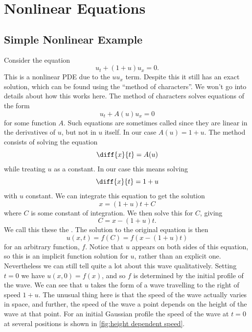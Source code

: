 \documentclass[fleqn]{NotesClass}
\begin{document}
    \chapter{Nonlinear Equations}
    \section{Simple Nonlinear Example}
    \label{sec:simple nonlinear example}
    Consider the equation
    \begin{equation}
        u_t + (1 + u)u_x = 0.
    \end{equation}
    This is a nonlinear PDE due to the \(uu_x\) term.
    Despite this it still has an exact solution, which can be found using the \enquote{method of characters}.
    We won't go into details about how this works here.
    The method of characters solves equations of the form
    \begin{equation}
        u_t + A(u) u_x = 0
    \end{equation}
    for some function \(A\).
    Such equations are sometimes called  since they are linear in the derivatives of \(u\), but not in \(u\) itself.
    In our case \(A(u) = 1 + u\).
    The method consists of solving the equation
    \begin{equation}
        \diff{x}{t} = A(u)
    \end{equation}
    while treating \(u\) as a constant.
    In our case this means solving
    \begin{equation}
        \diff{x}{t} = 1 + u
    \end{equation}
    with \(u\) constant.
    We can integrate this equation to get the solution
    \begin{equation}
        x = (1 + u)t + C
    \end{equation}
    where \(C\) is some constant of integration.
    We then solve this for \(C\), giving
    \begin{equation}
        C = x - (1 + u)t.
    \end{equation}
    We call this these the .
    The solution to the original equation is then
    \begin{equation}
        u(x, t) = f(C) = f(x - (1 + u)t)
    \end{equation}
    for an arbitrary function, \(f\).
    Notice that \(u\) appears on both sides of this equation, so this is an implicit function solution for \(u\), rather than an explicit one.
    Nevertheless we can still tell quite a lot about this wave qualitatively.
    Setting \(t = 0\) we have \(u(x, 0) = f(x)\), and so \(f\) is determined by the initial profile of the wave.
    We can see that \(u\) takes the form of a wave travelling to the right of speed \(1 + u\).
    The unusual thing here is that the speed of the wave actually varies in space, and further, the speed of the wave a point depends on the height of the wave at that point.
    For an initial Gaussian profile the speed of the wave at \(t = 0\) at several positions is shown in \cref{fig:height dependent speed}.
    
\end{document}
